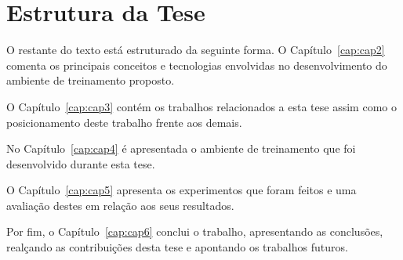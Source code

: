 \section{Estrutura da Tese}
\label{sec:estrutura}

O restante do texto está estruturado da seguinte forma. O Capítulo~\ref{cap:cap2} comenta os principais conceitos e tecnologias envolvidas no desenvolvimento do ambiente de treinamento proposto.

O Capítulo~\ref{cap:cap3} contém os trabalhos relacionados a esta tese assim como o posicionamento deste trabalho frente aos demais.

No Capítulo~\ref{cap:cap4} é apresentada o ambiente de treinamento que foi desenvolvido durante esta tese. 

O Capítulo~\ref{cap:cap5} apresenta os experimentos que foram feitos e uma avaliação destes em relação aos seus resultados.

Por fim, o Capítulo~\ref{cap:cap6} conclui o trabalho, apresentando as conclusões, realçando as contribuições desta tese e apontando os  trabalhos futuros.


